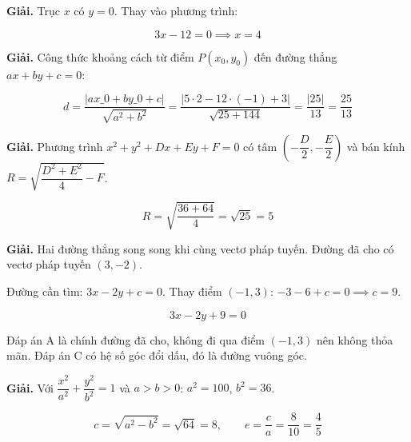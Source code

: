 \documentclass[11pt, a4paper]{article}
\begin{document}
\vspace{0.3cm}
\begin{dapan}[11 — Đáp án D]

\textbf{Giải.} Trục $x$ có $y = 0$. Thay vào phương trình:

$$3x - 12 = 0 \implies x = 4$$


\end{dapan}
\vspace{0.3cm}
\begin{dapan}[12 — Đáp án A]

\textbf{Giải.} Công thức khoảng cách từ điểm $P(x_0, y_0)$ đến đường thẳng $ax + by + c = 0$:

$$d = \dfrac{\lvert ax\_0 + by\_0 + c \rvert}{\sqrt{a^2 + b^2}} = \dfrac{\lvert 5 \cdot 2 - 12 \cdot (-1) + 3 \rvert}{\sqrt{25 + 144}} = \dfrac{\lvert 25 \rvert}{13} = \dfrac{25}{13}$$


\end{dapan}
\vspace{0.3cm}
\begin{dapan}[13 — Đáp án C]

\textbf{Giải.} Phương trình $x^2 + y^2 + Dx + Ey + F = 0$ có tâm $\left(-\dfrac{D}{2}, -\dfrac{E}{2}\right)$ và bán kính $R = \sqrt{\dfrac{D^2 + E^2}{4} - F}$.

$$R = \sqrt{\dfrac{36 + 64}{4}} = \sqrt{25} = 5$$


\end{dapan}
\vspace{0.3cm}
\begin{dapan}[14 — Đáp án B]

\textbf{Giải.} Hai đường thẳng song song khi cùng vectơ pháp tuyến. Đường đã cho có vectơ pháp tuyến $(3, -2)$.

Đường cần tìm: $3x - 2y + c = 0$. Thay điểm $(-1, 3)$: $-3 - 6 + c = 0 \implies c = 9$.

$$3x - 2y + 9 = 0$$

 Đáp án A là chính đường đã cho, không đi qua điểm $(-1, 3)$ nên không thỏa mãn. Đáp án C có hệ số góc đổi dấu, đó là đường vuông góc.


\end{dapan}
\vspace{0.3cm}
\begin{dapan}[15 — Đáp án A]

\textbf{Giải.} Với $\dfrac{x^2}{a^2} + \dfrac{y^2}{b^2} = 1$ và $a > b > 0$: $a^2 = 100$, $b^2 = 36$.

$$c = \sqrt{a^2 - b^2} = \sqrt{64} = 8, \qquad e = \dfrac{c}{a} = \dfrac{8}{10} = \dfrac{4}{5}$$


\end{dapan}
\end{document}
